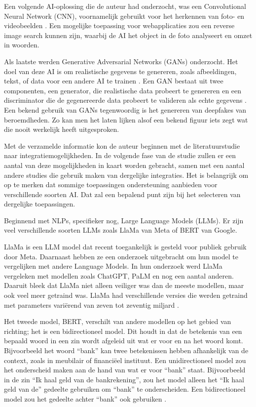 \documentclass[dutch]{hogent-article}
\begin{document}
Een volgende AI-oplossing die de auteur had onderzocht, was een Convolutional Neural Network (CNN), voornamelijk gebruikt voor het herkennen van foto- en videobeelden \autocite{IBMCNN2023}. Een mogelijke toepassing voor webapplicaties zou een reverse image search kunnen zijn, waarbij de AI het object in de foto analyseert en omzet in woorden.

Als laatste werden Generative Adversarial Networks (GANs) onderzocht. Het doel van deze AI is om realistische gegevens te genereren, zoals afbeeldingen, tekst, of data voor een andere AI te trainen \autocite{Goodfellow2020}. Een GAN bestaat uit twee componenten, een generator, die realistische data probeert te genereren en een discriminator die de gegenereerde data probeert te valideren als echte gegevens \autocite{Goodfellow2020}. Een bekend gebruik van GANs tegenwoordig is het genereren van deepfakes van beroemdheden. Zo kan men het laten lijken alsof een bekend figuur iets zegt wat die nooit werkelijk heeft uitgesproken.

Met de verzamelde informatie kon de auteur beginnen met de literatuurstudie naar integratiemogelijkheden. In de volgende fase van de studie zullen er een aantal van deze mogelijkheden in kaart worden gebracht, samen met een aantal andere studies die gebruik maken van dergelijke integraties. Het is belangrijk om op te merken dat sommige toepassingen ondersteuning aanbieden voor verschillende soorten AI. Dat zal een bepalend punt zijn bij het selecteren van dergelijke toepassingen.

Beginnend met NLPs, specifieker nog, Large Language Models (LLMs). Er zijn veel verschillende soorten LLMs zoals LlaMa van Meta of BERT van Google. 

LlaMa is een LLM model dat recent toegankelijk is gesteld voor publiek gebruik door Meta. Daarnaast hebben ze een onderzoek uitgebracht om hun model te vergelijken met andere Language Models. In hun onderzoek werd LlaMa vergeleken met modellen zoals ChatGPT, PaLM en nog een aantal anderen. Daaruit bleek dat LlaMa niet alleen veiliger was dan de meeste modellen, maar ook veel meer getraind was. LlaMa had verschillende versies die werden getraind met parameters variërend van zeven tot zeventig miljard \autocite{Touvron2023Llama2O}.

Het tweede model, BERT, verschilt van andere modellen op het gebied van richting; het is een bidirectioneel model. Dit houdt in dat de betekenis van een bepaald woord in een zin wordt afgeleid uit wat er voor en na het woord komt. Bijvoorbeeld het woord “bank” kan twee betekenissen hebben afhankelijk van de context, zoals in meubilair of financiëel instituut. Een unidirectioneel model zou het onderscheid maken aan de hand van wat er voor “bank” staat. Bijvoorbeeld in de zin “Ik haal geld van de bankrekening”, zou het model alleen het “Ik haal geld van de” gedeelte gebruiken om “bank” te onderscheiden. Een bidirectioneel model zou het gedeelte achter “bank” ook gebruiken \autocite{Devlin2018}.
\end{document}
